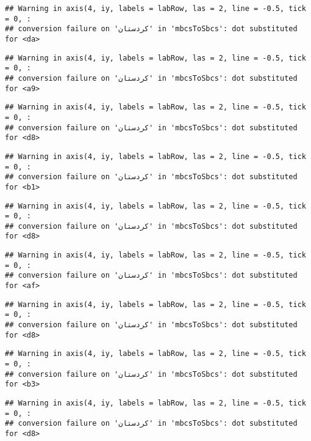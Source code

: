 \documentclass[
]{article}
\begin{document}
\begin{verbatim}
## Warning in axis(4, iy, labels = labRow, las = 2, line = -0.5, tick = 0, :
## conversion failure on 'کردستان' in 'mbcsToSbcs': dot substituted for <da>
\end{verbatim}

\begin{verbatim}
## Warning in axis(4, iy, labels = labRow, las = 2, line = -0.5, tick = 0, :
## conversion failure on 'کردستان' in 'mbcsToSbcs': dot substituted for <a9>
\end{verbatim}

\begin{verbatim}
## Warning in axis(4, iy, labels = labRow, las = 2, line = -0.5, tick = 0, :
## conversion failure on 'کردستان' in 'mbcsToSbcs': dot substituted for <d8>
\end{verbatim}

\begin{verbatim}
## Warning in axis(4, iy, labels = labRow, las = 2, line = -0.5, tick = 0, :
## conversion failure on 'کردستان' in 'mbcsToSbcs': dot substituted for <b1>
\end{verbatim}

\begin{verbatim}
## Warning in axis(4, iy, labels = labRow, las = 2, line = -0.5, tick = 0, :
## conversion failure on 'کردستان' in 'mbcsToSbcs': dot substituted for <d8>
\end{verbatim}

\begin{verbatim}
## Warning in axis(4, iy, labels = labRow, las = 2, line = -0.5, tick = 0, :
## conversion failure on 'کردستان' in 'mbcsToSbcs': dot substituted for <af>
\end{verbatim}

\begin{verbatim}
## Warning in axis(4, iy, labels = labRow, las = 2, line = -0.5, tick = 0, :
## conversion failure on 'کردستان' in 'mbcsToSbcs': dot substituted for <d8>
\end{verbatim}

\begin{verbatim}
## Warning in axis(4, iy, labels = labRow, las = 2, line = -0.5, tick = 0, :
## conversion failure on 'کردستان' in 'mbcsToSbcs': dot substituted for <b3>
\end{verbatim}

\begin{verbatim}
## Warning in axis(4, iy, labels = labRow, las = 2, line = -0.5, tick = 0, :
## conversion failure on 'کردستان' in 'mbcsToSbcs': dot substituted for <d8>
\end{verbatim}
\end{document}

